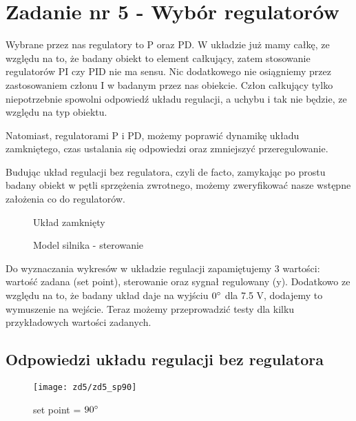 \documentclass[11 pt]{article}
\begin{document}
\setcounter{section}{5}
\setcounter{figure}{0}
\section*{Zadanie nr 5 - Wybór regulatorów}

Wybrane przez nas regulatory to P oraz PD. W układzie już mamy całkę, ze względu na to, że badany obiekt to element całkujący, zatem stosowanie regulatorów PI czy PID nie ma sensu. Nic dodatkowego nie osiągniemy przez zastosowaniem członu I w badanym przez nas obiekcie. Człon całkujący tylko niepotrzebnie spowolni odpowiedź układu regulacji, a uchybu i tak nie będzie, ze względu na typ obiektu.

Natomiast, regulatorami P i PD, możemy poprawić dynamikę układu zamkniętego, czas ustalania się odpowiedzi oraz zmniejszyć przeregulowanie.

Budując układ regulacji bez regulatora, czyli de facto, zamykając po prostu badany obiekt w pętli sprzężenia zwrotnego, możemy zweryfikować nasze wstępne założenia co do regulatorów.

\begin{figure}[h!]
	\centerline{
	}
	\caption{Układ zamknięty}
\end{figure}

\begin{figure}[h!]
	\centerline{
	}
	\caption{Model silnika - sterowanie}
\end{figure}

Do wyznaczania wykresów w układzie regulacji zapamiętujemy 3 wartości: wartość zadana (set point), sterowanie oraz sygnał regulowany (y). Dodatkowo ze względu na to, że badany układ daje na wyjściu $0 \degree$ dla 7.5 V, dodajemy to wymuszenie na wejście. Teraz możemy przeprowadzić testy dla kilku przykładowych wartości zadanych.

\newpage

\subsection*{Odpowiedzi układu regulacji bez regulatora}

\begin{figure}[h!]
	\centerline{
	\texttt{[image: zd5/zd5\_sp90]}
	}
	\caption{set point = $90 \degree$}
	\label{fig:zd5}
\end{figure}
\end{document}

